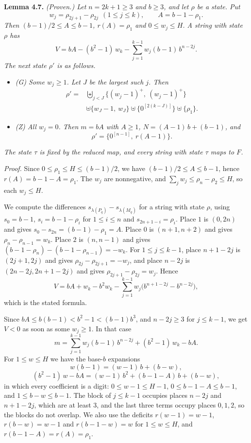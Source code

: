 \documentclass[11pt,letterpaper]{article}
\providecommand{\tightlist}{%
  \setlength{\itemsep}{0pt}\setlength{\parskip}{0pt}}
\theoremstyle{paperstyle}
\theoremstyle{paperstyledef}
\theoremstyle{paperstylerem}
\begin{document}
\textbf{Lemma 4.7.} \emph{(Proven.) Let \(n = 2k+1 \geq 3\) and \(b \geq 3\), and let \(\rho\) be a state. Put} \[w_j = \rho_{2j+1} - \rho_{2j} \ \ (1 \leq j \leq k), \qquad A = b - 1 - \rho_1.\] \emph{Then \((b-1)/2 \leq A \leq b-1\), \(r(A) = \rho_1\) and \(0 \leq w_j \leq H\). A string with state \(\rho\) has} \[V = bA - (b^2 - 1)\, w_k - \sum_{j=1}^{k-1} w_j (b-1)\, b^{n-2j}.\] \emph{The next state \(\rho'\) is as follows.}

\begin{itemize}
\tightlist
\item
  \emph{(G) Some \(w_j \geq 1\). Let \(J\) be the largest such \(j\). Then} \[\begin{aligned}\rho' = {} & \biguplus_{j<J} \{(w_j - 1)^+,\ (w_j - 1)^+\} \\ & \uplus \{w_J - 1,\ w_J\} \uplus \{0^{[2(k-J)]}\} \uplus \{\rho_1\}.\end{aligned}\]
\item
  \emph{(Z) All \(w_j = 0\). Then \(m = bA\) with \(A \geq 1\), \(N = (A-1)\,b + (b-1)\), and} \[\rho' = \{0^{[n-1]},\ r(A-1)\}.\]
\end{itemize}

\emph{The state \(\tau\) is fixed by the reduced map, and every string with state \(\tau\) maps to \(F\).}

\emph{Proof.} Since \(0 \leq \rho_1 \leq H \leq (b-1)/2\), we have \((b-1)/2 \leq A \leq b-1\), hence \(r(A) = b-1-A = \rho_1\). The \(w_j\) are nonnegative, and \(\sum_j w_j \leq \rho_n - \rho_2 \leq H\), so each \(w_j \leq H\).

We compute the differences \(s_{\lambda(P_q)} - s_{\lambda(M_q)}\) for a string with state \(\rho\), using \(s_0 = b-1\), \(s_i = b-1-\rho_i\) for \(1 \leq i \leq n\) and \(s_{2n+1-i} = \rho_i\). Place \(1\) is \((0, 2n)\) and gives \(s_0 - s_{2n} = (b-1) - \rho_1 = A\). Place \(0\) is \((n+1, n+2)\) and gives \(\rho_n - \rho_{n-1} = w_k\). Place \(2\) is \((n, n-1)\) and gives \((b-1-\rho_n) - (b-1-\rho_{n-1}) = -w_k\). For \(1 \leq j \leq k-1\), place \(n+1-2j\) is \((2j+1, 2j)\) and gives \(\rho_{2j} - \rho_{2j+1} = -w_j\), and place \(n-2j\) is \((2n-2j, 2n+1-2j)\) and gives \(\rho_{2j+1} - \rho_{2j} = w_j\). Hence \[V = bA + w_k - b^2 w_k - \sum_{j=1}^{k-1} w_j \bigl(b^{n+1-2j} - b^{n-2j}\bigr),\] which is the stated formula.

Since \(bA \leq b(b-1) < b^2 - 1 < (b-1) b^3\), and \(n - 2j \geq 3\) for \(j \leq k-1\), we get \(V < 0\) as soon as some \(w_j \geq 1\). In that case \[m = \sum_{j=1}^{k-1} w_j (b-1)\, b^{n-2j} + (b^2 - 1)\, w_k - bA.\] For \(1 \leq w \leq H\) we have the base-\(b\) expansions \[w(b-1) = (w-1)\, b + (b-w),\] \[(b^2 - 1)\, w - bA = (w-1)\, b^2 + (b-1-A)\, b + (b-w),\] in which every coefficient is a digit: \(0 \leq w - 1 \leq H - 1\), \(0 \leq b-1-A \leq b-1\), and \(1 \leq b-w \leq b-1\). The block of \(j \leq k-1\) occupies places \(n-2j\) and \(n+1-2j\), which are at least \(3\), and the last three terms occupy places \(0, 1, 2\), so the blocks do not overlap. We also use the deficits \(r(w-1) = w-1\), \(r(b-w) = w-1\) and \(r(b-1-w) = w\) for \(1 \leq w \leq H\), and \(r(b-1-A) = r(A) = \rho_1\).
\end{document}
